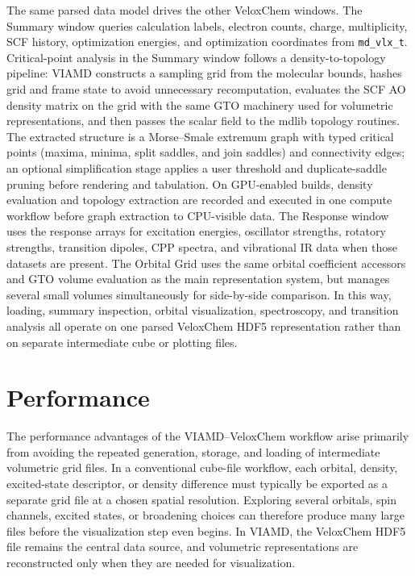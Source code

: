 \documentclass[journal=jacsat,manuscript=article]{achemso}
\begin{document}
The same parsed data model drives the other VeloxChem windows. The Summary window queries calculation labels, electron counts, charge, multiplicity, SCF history, optimization energies, and optimization coordinates from \texttt{md\_vlx\_t}. Critical-point analysis in the Summary window follows a density-to-topology pipeline: VIAMD constructs a sampling grid from the molecular bounds, hashes grid and frame state to avoid unnecessary recomputation, evaluates the SCF AO density matrix on the grid with the same GTO machinery used for volumetric representations, and then passes the scalar field to the mdlib topology routines. The extracted structure is a Morse--Smale extremum graph with typed critical points (maxima, minima, split saddles, and join saddles) and connectivity edges; an optional simplification stage applies a user threshold and duplicate-saddle pruning before rendering and tabulation. On GPU-enabled builds, density evaluation and topology extraction are recorded and executed in one compute workflow before graph extraction to CPU-visible data. The Response window uses the response arrays for excitation energies, oscillator strengths, rotatory strengths, transition dipoles, CPP spectra, and vibrational IR data when those datasets are present. The Orbital Grid uses the same orbital coefficient accessors and GTO volume evaluation as the main representation system, but manages several small volumes simultaneously for side-by-side comparison. In this way, loading, summary inspection, orbital visualization, spectroscopy, and transition analysis all operate on one parsed VeloxChem HDF5 representation rather than on separate intermediate cube or plotting files.

\section{Performance}
The performance advantages of the VIAMD--VeloxChem workflow arise primarily from avoiding the repeated generation, storage, and loading of intermediate volumetric grid files. In a conventional cube-file workflow, each orbital, density, excited-state descriptor, or density difference must typically be exported as a separate grid file at a chosen spatial resolution. Exploring several orbitals, spin channels, excited states, or broadening choices can therefore produce many large files before the visualization step even begins. In VIAMD, the VeloxChem HDF5 file remains the central data source, and volumetric representations are reconstructed only when they are needed for visualization.
\end{document}
